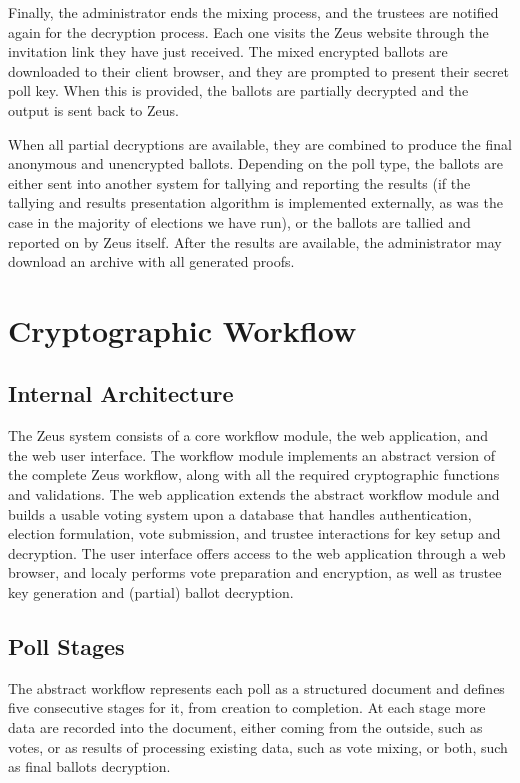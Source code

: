 \documentclass[letterpaper,10pt]{article}
\begin{document}
Finally, the administrator ends the mixing process,
and the trustees are notified again for the decryption process.
Each one visits the Zeus website through the invitation link they have
just received.
The mixed encrypted ballots are downloaded to their client browser,
and they are prompted to present their secret poll key.
When this is provided, the ballots are partially decrypted 
and the output is sent back to Zeus.

When all partial decryptions are available, they are combined to produce
the final anonymous and unencrypted ballots.
Depending on the poll type, the ballots are either sent into another
system for tallying and reporting the results (if the tallying
and results presentation algorithm is implemented externally, as was
the case in the majority of elections we have run),
or the ballots are tallied and reported on by Zeus itself.
After the results are available,
the administrator may download an archive with all generated proofs.

\section{Cryptographic Workflow}
\label{sec:crypto_workflow}

\subsection{Internal Architecture}
The Zeus system consists of a core workflow module, the web application,
and the web user interface.
The workflow module implements an abstract version of the complete Zeus
workflow, along with all the required cryptographic functions and
validations. The web application extends the abstract workflow module
and builds a usable voting system upon a database
that handles authentication, election formulation, vote submission,
and trustee interactions for key setup and decryption.
The user interface offers access to the web application through
a web browser, and localy performs vote preparation and encryption,
as well as trustee key generation and (partial) ballot decryption.

\subsection{Poll Stages}
The abstract workflow represents each poll as a structured document
and defines five consecutive stages for it, from creation to completion.
At each stage more data are recorded into the document,
either coming from the outside, such as votes,
or as results of processing existing data, such as vote mixing,
or both, such as final ballots decryption.
\end{document}
